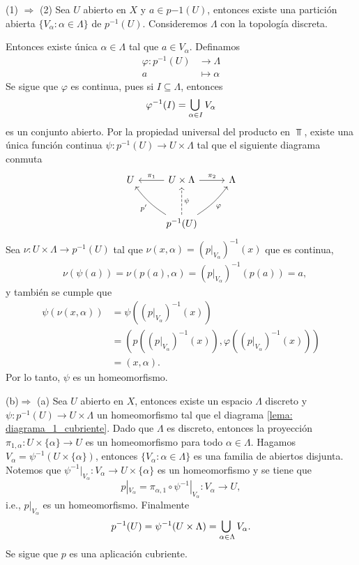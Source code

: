 \begin{dem}
    (1) $\Rightarrow$ (2) Sea $U$ abierto en $X$ y $a\in p{-1}(U)$, entonces existe una partición abierta $\{V_\alpha:\alpha\in\Lambda\}$ de $p^{-1}(U)$. Consideremos $\Lambda$ con la topología discreta.
    
    Entonces existe única $\alpha\in \Lambda$ tal que $a\in V_{\alpha}$. Definamos 
    \begin{align*}
        \varphi: p^{-1}(U)&\to\Lambda\\
        a&\mapsto \alpha
    \end{align*}
    Se sigue que $\varphi$ es continua, pues si $ I\subseteq\Lambda$, entonces
  $$\varphi^{-1}(I)=\medcup_{\alpha\in I}V_\alpha$$ 
  es un conjunto abierto. Por la propiedad universal del producto en $\Top$, existe una única función continua $\psi:p^{-1}(U)\to U\times \Lambda$ tal que el siguiente diagrama conmuta
  \begin{equation*}
        \begin{tikzcd}[row sep = 1cm]
            U\arrow["\pi_1"',from=r]\arrow[from=rd, bend left=10, "p'"] & U\times \Lambda \arrow[from=d, dashed, "\psi"'] & \Lambda \arrow[from=l, "\pi_2"] \arrow[from = dl, bend right=10, "\varphi"'] \\
                             &  p^{-1}(U) & 
        \end{tikzcd}
    \end{equation*}
    Sea $\nu:U\times \Lambda\to p^{-1}(U)$ tal que $\nu(x,\alpha)=(p|_{V_\alpha})^{-1}(x)$ que es continua,
    \begin{align*}
        &\nu(\psi(a))=\nu(p(a),\alpha)=(p|_{V_\alpha})^{-1}(p(a))=a,
    \end{align*}
    y también se cumple que
    \begin{align*}
        \psi(\nu(x,\alpha))&=\psi((p|_{V_\alpha})^{-1}(x))\\
        &=(p((p|_{V_\alpha})^{-1}(x)),\varphi((p|_{V_\alpha})^{-1}(x)))\\
        &=(x,\alpha).
    \end{align*}
    Por lo tanto, $\psi$ es un homeomorfismo.

    (b)$\Rightarrow$ (a) Sea $U$ abierto en $X$, entonces existe un espacio $\Lambda$ discreto y $\psi:p^{-1}(U)\to U\times \Lambda$ un homeomorfismo tal que el diagrama \ref{lema: diagrama_1_cubriente}. Dado que $\Lambda$ es discreto, entonces la proyección $\pi_{1,\alpha}:U\times \{\alpha\}\to U$ es un homeomorfismo para todo $\alpha\in\Lambda$. Hagamos $V_\alpha=\psi^{-1}(U\times \{\alpha\})$, entonces $\{V_\alpha:\alpha\in \Lambda\}$ es una familia de abiertos disjunta. Notemos que $\psi^{-1}|_{V_\alpha}:V_\alpha\to U\times\{\alpha\}$ es un homeomorfismo y se tiene que
    \begin{equation*}
        p|_{V_\alpha}=\pi_{\alpha,1}\circ \psi^{-1}|_{V_\alpha}:V_\alpha\to U,
    \end{equation*}
    i.e., $p|_{V_\alpha}$ es un homeomorfismo. Finalmente
    \begin{equation*}
        p^{-1}(U)=\psi^{-1}(U\times\Lambda)=\medcup_{\alpha\in\Lambda}V_\alpha.
    \end{equation*}
    Se sigue que $p$ es una aplicación cubriente.
\end{dem}

